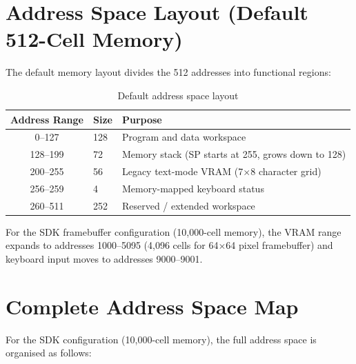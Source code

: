 \documentclass[12pt,a4paper,twoside]{book}
\theoremstyle{trinarytheorem}
\theoremstyle{trinarydefinition}
\begin{document}
\section{Address Space Layout (Default 512-Cell Memory)}

The default memory layout divides the 512 addresses into functional regions:

\begin{table}[H]
\centering
\caption{Default address space layout}
\label{tab:memlayout}
\begin{tabular}{cll}
\toprule
Address Range & Size & Purpose \\
\midrule
0--127 & 128 & Program and data workspace \\
128--199 & 72 & Memory stack (SP starts at 255, grows down to 128) \\
200--255 & 56 & Legacy text-mode VRAM (7$\times$8 character grid) \\
256--259 & 4 & Memory-mapped keyboard status \\
260--511 & 252 & Reserved / extended workspace \\
\bottomrule
\end{tabular}
\end{table}

For the SDK framebuffer configuration (10,000-cell memory), the VRAM range expands to
addresses 1000--5095 (4,096 cells for 64$\times$64 pixel framebuffer) and keyboard
input moves to addresses 9000--9001.

\section{Complete Address Space Map}

For the SDK configuration (10,000-cell memory), the full address space is organised
as follows:
\end{document}
